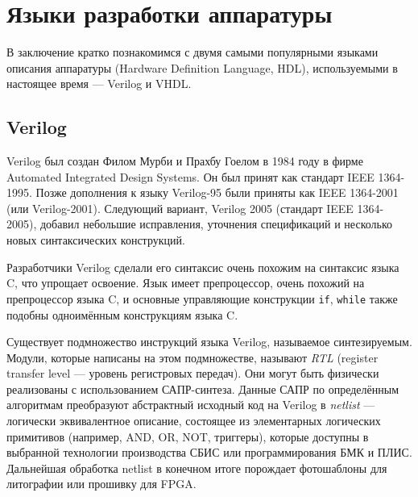 

\section{Языки разработки аппаратуры}

В заключение кратко познакомимся с двумя самыми популярными языками описания аппаратуры (\abbr Hardware Definition Language, HDL), используемыми в настоящее время --- Verilog и VHDL.

\subsection{Verilog}
 
Verilog был создан Филом Мурби и Прахбу Гоелом в  1984 году в фирме Auto\-mated In\-te\-gra\-ted De\-sign Sys\-tems. Он был принят как стандарт IEEE 1364-1995. Позже дополнения к языку Verilog-95 были приняты как IEEE 1364-2001 (или Veri\-log-2001). Следующий вариант, Verilog 2005 (стандарт IEEE 1364-2005), добавил небольшие исправления, уточнения спецификаций и несколько новых синтаксических конструкций.

Разработчики Verilog сделали его синтаксис очень похожим на синтаксис языка C, что упрощает освоение. Язык имеет препроцессор, очень похожий на препроцессор языка C, и основные управляющие конструкции \texttt{if}, \texttt{while} также подобны одноимённым конструкциям языка C. 

Существует подмножество инструкций языка Verilog, называемое синтезируемым. Модули, которые написаны на этом подмножестве, называют \textit{RTL} (\abbr register transfer level --- уровень регистровых передач). Они могут быть физически реализованы с использованием САПР-синтеза. Данные САПР по определённым алгоритмам преобразуют абстрактный исходный код на Verilog в \emph{netlist} --- логически эквивалентное описание, состоящее из элементарных логических примитивов (например, AND, OR, NOT, триггеры), которые доступны в выбранной технологии производства СБИС или программирования БМК и ПЛИС. Дальнейшая обработка netlist в конечном итоге порождает фотошаблоны для литографии или прошивку для FPGA.

